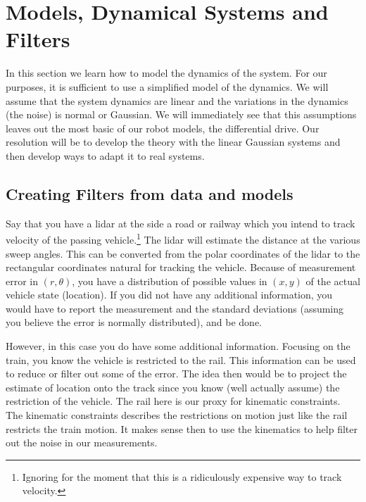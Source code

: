 \hypertarget{models-dynamical-systems-and-filters}{%
\section{Models, Dynamical Systems and
Filters}\label{models-dynamical-systems-and-filters}}

In this section we learn how to model the dynamics of the system. For
our purposes, it is sufficient to use a simplified model of the
dynamics. We will assume that the system dynamics are linear and the
variations in the dynamics (the noise) is normal or Gaussian. We will
immediately see that this assumptions leaves out the most basic of our
robot models, the differential drive. Our resolution will be to develop
the theory with the linear Gaussian systems and then develop ways to
adapt it to real systems.

\hypertarget{creating-filters-from-data-and-models}{%
\subsection{Creating Filters from data and
models}\label{creating-filters-from-data-and-models}}

Say that you have a lidar at the side a road or railway which you intend
to track velocity of the passing vehicle.\footnote{Ignoring for the
  moment that this is a ridiculously expensive way to track velocity.}
The lidar will estimate the distance at the various sweep angles. This
can be converted from the polar coordinates of the lidar to the
rectangular coordinates natural for tracking the vehicle. Because of
measurement error in \((r, \theta)\), you have a distribution of
possible values in \((x,y)\) of the actual vehicle state (location). If
you did not have any additional information, you would have to report
the measurement and the standard deviations (assuming you believe the
error is normally distributed), and be done.

However, in this case you do have some additional information. Focusing
on the train, you know the vehicle is restricted to the rail. This
information can be used to reduce or filter out some of the error. The
idea then would be to project the estimate of location onto the track
since you know (well actually assume) the restriction of the vehicle.
The rail here is our proxy for kinematic constraints. The kinematic
constraints describes the restrictions on motion just like the rail
restricts the train motion. It makes sense then to use the kinematics to
help filter out the noise in our measurements.

